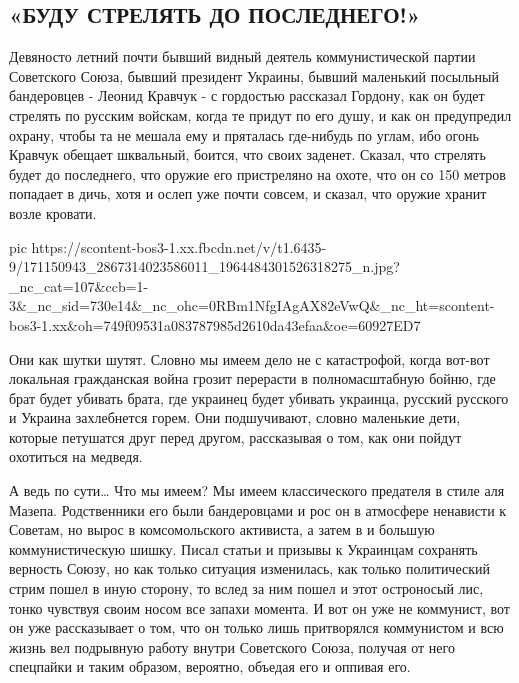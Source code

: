  
 
 
 
 

\subsection{«БУДУ СТРЕЛЯТЬ ДО ПОСЛЕДНЕГО!»}
\label{sec:07_04_2021.fb.volga_vasilij.1.kravchuk}

Девяносто летний почти бывший видный деятель коммунистической партии Советского
Союза, бывший президент Украины, бывший маленький посыльный бандеровцев -
Леонид Кравчук - с гордостью рассказал Гордону, как он будет стрелять по
русским войскам, когда те придут по его душу, и как он предупредил охрану,
чтобы та не мешала ему и пряталась где-нибудь по углам, ибо огонь Кравчук
обещает шквальный, боится, что своих заденет. Сказал, что стрелять будет до
последнего, что оружие его пристреляно на охоте, что он со 150 метров попадает
в дичь, хотя и ослеп уже почти совсем, и сказал, что оружие хранит возле
кровати. 

\ifcmt
  pic https://scontent-bos3-1.xx.fbcdn.net/v/t1.6435-9/171150943_2867314023586011_1964484301526318275_n.jpg?_nc_cat=107&ccb=1-3&_nc_sid=730e14&_nc_ohc=0RBm1NfgIAgAX82eVwQ&_nc_ht=scontent-bos3-1.xx&oh=749f09531a083787985d2610da43efaa&oe=60927ED7
\fi

Они как шутки шутят. Словно мы имеем дело не с катастрофой, когда вот-вот
локальная гражданская война грозит перерасти в полномасштабную бойню, где брат
будет убивать брата, где украинец будет убивать украинца, русский русского и
Украина захлебнется горем. Они подшучивают, словно маленькие дети, которые
петушатся друг перед другом, рассказывая о том, как они пойдут охотиться на
медведя. 

А ведь по сути… Что мы имеем? Мы имеем классического предателя в стиле аля
Мазепа. Родственники его были бандеровцами и рос он в атмосфере ненависти к
Советам, но вырос в комсомольского активиста, а затем в и большую
коммунистическую шишку. Писал статьи и призывы к Украинцам сохранять верность
Союзу, но как только ситуация изменилась, как только политический стрим пошел в
иную сторону, то вслед за ним пошел и этот остроносый лис, тонко чувствуя своим
носом все запахи момента. И вот он уже не коммунист, вот он уже рассказывает о
том, что он только лишь притворялся коммунистом и всю жизнь вел подрывную
работу внутри Советского Союза, получая от него спецпайки и таким образом,
вероятно, объедая его и оппивая его. 

